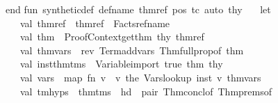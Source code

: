 \begin{isabellebody}
\ end\isanewline
\isanewline
\isanewline
fun\ synthetic{\isacharunderscore}{\kern0pt}def\ def{\isacharunderscore}{\kern0pt}name\ thmref\ pos\ tc\ auto\ thy\ {\isacharequal}{\kern0pt}\isanewline
\ \ let\isanewline
\ \ \ \ val\ {\isacharparenleft}{\kern0pt}thm{\isacharunderscore}{\kern0pt}ref{\isacharcomma}{\kern0pt}{\isacharunderscore}{\kern0pt}{\isacharparenright}{\kern0pt}\ {\isacharequal}{\kern0pt}\ thmref\ {\isacharbar}{\kern0pt}{\isachargreater}{\kern0pt}{\isachargreater}{\kern0pt}\ Facts{\isachardot}{\kern0pt}ref{\isacharunderscore}{\kern0pt}name\isanewline
\ \ \ \ val\ thm\ {\isacharequal}{\kern0pt}\ Proof{\isacharunderscore}{\kern0pt}Context{\isachardot}{\kern0pt}get{\isacharunderscore}{\kern0pt}thm\ thy\ thm{\isacharunderscore}{\kern0pt}ref{\isacharsemicolon}{\kern0pt}\isanewline
\ \ \ \ val\ thm{\isacharunderscore}{\kern0pt}vars\ {\isacharequal}{\kern0pt}\ rev\ {\isacharparenleft}{\kern0pt}Term{\isachardot}{\kern0pt}add{\isacharunderscore}{\kern0pt}vars\ {\isacharparenleft}{\kern0pt}Thm{\isachardot}{\kern0pt}full{\isacharunderscore}{\kern0pt}prop{\isacharunderscore}{\kern0pt}of\ thm{\isacharparenright}{\kern0pt}\ {\isacharbrackleft}{\kern0pt}{\isacharbrackright}{\kern0pt}{\isacharparenright}{\kern0pt}{\isacharsemicolon}{\kern0pt}\isanewline
\ \ \ \ val\ {\isacharparenleft}{\kern0pt}{\isacharparenleft}{\kern0pt}{\isacharparenleft}{\kern0pt}{\isacharunderscore}{\kern0pt}{\isacharcomma}{\kern0pt}inst{\isacharparenright}{\kern0pt}{\isacharcomma}{\kern0pt}thm{\isacharunderscore}{\kern0pt}tms{\isacharparenright}{\kern0pt}{\isacharcomma}{\kern0pt}{\isacharunderscore}{\kern0pt}{\isacharparenright}{\kern0pt}\ {\isacharequal}{\kern0pt}\ Variable{\isachardot}{\kern0pt}import\ true\ {\isacharbrackleft}{\kern0pt}thm{\isacharbrackright}{\kern0pt}\ thy\isanewline
\ \ \ \ val\ vars\ {\isacharequal}{\kern0pt}\ map\ {\isacharparenleft}{\kern0pt}fn\ v\ {\isacharequal}{\kern0pt}{\isachargreater}{\kern0pt}\ {\isacharparenleft}{\kern0pt}v{\isacharcomma}{\kern0pt}\ the\ {\isacharparenleft}{\kern0pt}Vars{\isachardot}{\kern0pt}lookup\ inst\ v{\isacharparenright}{\kern0pt}{\isacharparenright}{\kern0pt}{\isacharparenright}{\kern0pt}\ thm{\isacharunderscore}{\kern0pt}vars{\isacharsemicolon}{\kern0pt}\isanewline
\ \ \ \ val\ {\isacharparenleft}{\kern0pt}tm{\isacharcomma}{\kern0pt}hyps{\isacharparenright}{\kern0pt}\ {\isacharequal}{\kern0pt}\ thm{\isacharunderscore}{\kern0pt}tms\ {\isacharbar}{\kern0pt}{\isachargreater}{\kern0pt}\ hd\ {\isacharbar}{\kern0pt}{\isachargreater}{\kern0pt}\ pair\ Thm{\isachardot}{\kern0pt}concl{\isacharunderscore}{\kern0pt}of\ Thm{\isachardot}{\kern0pt}prems{\isacharunderscore}{\kern0pt}of\isanewline

\end{isabellebody}
